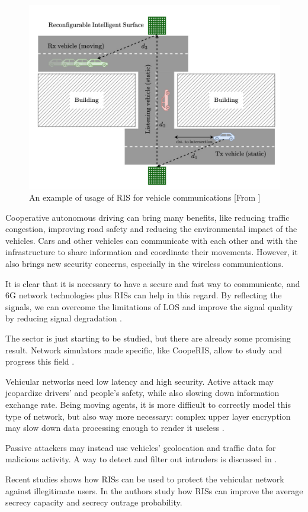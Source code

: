 \begin{figure}[H]
  \centering
  \includegraphics[width=0.5\linewidth]{imgs/RIS vehicles.png}
  \caption{An example of usage of RIS for vehicle communications [From \cite{SEGATA2024110443}]}
\end{figure}

Cooperative autonomous driving can bring many benefits, like reducing traffic congestion, improving road safety and reducing the environmental impact of the vehicles. Cars and other vehicles can communicate with each other and with the infrastructure to share information and coordinate their movements. However, it also brings new security concerns, especially in the wireless communications.

It is clear that it is necessary to have a secure and fast way to communicate, and 6G network technologies plus RISs can help in this regard. By reflecting the signals, we can overcome the limitations of LOS and improve the signal quality by reducing signal degradation \cite{10715713}.

The sector is just starting to be studied, but there are already some promising result. Network simulators made specific, like CoopeRIS, allow to study and progress this field \cite{SEGATA2024110443}.

Vehicular networks need low latency and high security. Active attack may jeopardize drivers' and people's safety, while also slowing down information exchange rate. Being moving agents, it is more difficult to correctly model this type of network, but also way more necessary: complex upper layer encryption may slow down data processing enough to render it useless \cite{8403278}.

Passive attackers may instead use vehicles' geolocation and traffic data for malicious activity. A way to detect and filter out intruders is discussed in \cite{8474336}.

Recent studies shows how RISs can be used to protect the vehicular network against illegitimate users. In \cite{makarfi2020reconfigurableintelligentsurfacesenabledvehicular} the authors study how RISs can improve the average secrecy capacity and secrecy outrage probability.

